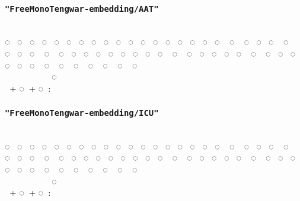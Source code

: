 \documentclass{article}
\begin{document}
\subsubsection*{\texttt{"FreeMonoTengwar-embedding/AAT"}}

\embedAAT
                          \\
◌ ◌ ◌ ◌ ◌ ◌ ◌ ◌ ◌ ◌ ◌ ◌ ◌ ◌ ◌ ◌ ◌ ◌ ◌ ◌ ◌ ◌ ◌ ◌ ◌ ◌ ◌ ◌ ◌ ◌ ◌ ◌ ◌ ◌ ◌ ◌ ◌ ◌ ◌ ◌ ◌ ◌ ◌ ◌ ◌ ◌ ◌ ◌ ◌ ◌ ◌ ◌ ◌ ◌ ◌ ◌\\
      ◌‍ ‍ ‍ ‍ \\
 \normalfont + \embedAAT ◌ \normalfont + \embedAAT ◌ : 

\subsubsection*{\texttt{"FreeMonoTengwar-embedding/ICU"}}

\embedICU
                          \\
◌ ◌ ◌ ◌ ◌ ◌ ◌ ◌ ◌ ◌ ◌ ◌ ◌ ◌ ◌ ◌ ◌ ◌ ◌ ◌ ◌ ◌ ◌ ◌ ◌ ◌ ◌ ◌ ◌ ◌ ◌ ◌ ◌ ◌ ◌ ◌ ◌ ◌ ◌ ◌ ◌ ◌ ◌ ◌ ◌ ◌ ◌ ◌ ◌ ◌ ◌ ◌ ◌ ◌ ◌ ◌\\
      ◌‍ ‍ ‍ ‍ \\
 \normalfont + \embedICU ◌ \normalfont + \embedICU ◌ : 
\end{document}
